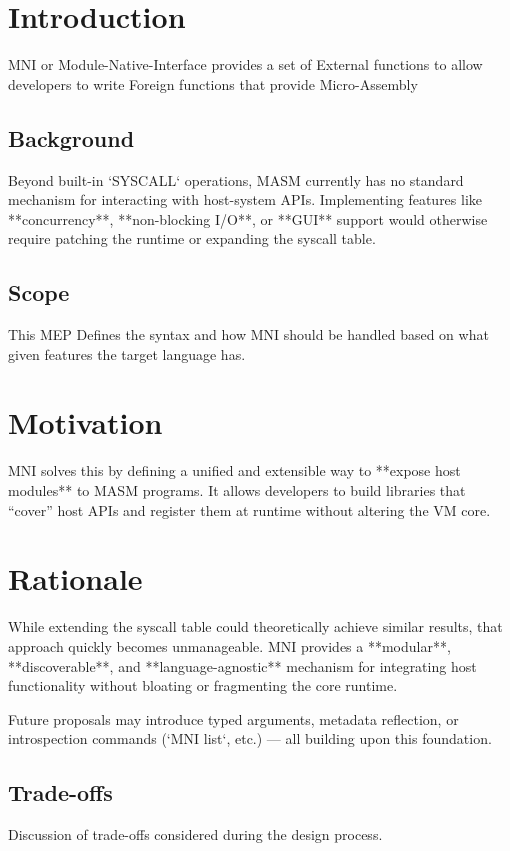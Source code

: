 \documentclass[11pt]{article}
\begin{document}
	\tableofcontents
	\newpage
	
	\section{Introduction}
	MNI or Module-Native-Interface provides a set of External functions to allow developers
	to write Foreign functions that provide Micro-Assembly 
	
	\subsection{Background}
	Beyond built-in `SYSCALL` operations, MASM currently has no standard mechanism for interacting with host-system APIs.  
	Implementing features like **concurrency**, **non-blocking I/O**, or **GUI** support would otherwise require patching the runtime or expanding the syscall table.
	
	\subsection{Scope}
	This MEP Defines the syntax and how MNI should be handled based on what given features the target language has.
	
	\section{Motivation}
	MNI solves this by defining a unified and extensible way to **expose host modules** to MASM programs.  
	It allows developers to build libraries that “cover” host APIs and register them at runtime without altering the VM core.
	
	\section{Rationale}
	While extending the syscall table could theoretically achieve similar results, that approach quickly becomes unmanageable.  
	MNI provides a **modular**, **discoverable**, and **language-agnostic** mechanism for integrating host functionality without bloating or fragmenting the core runtime.
	
	Future proposals may introduce typed arguments, metadata reflection, or introspection commands (`MNI list`, etc.) — all building upon this foundation.
	\subsection{Trade-offs}
	Discussion of trade-offs considered during the design process.
	
\end{document}
